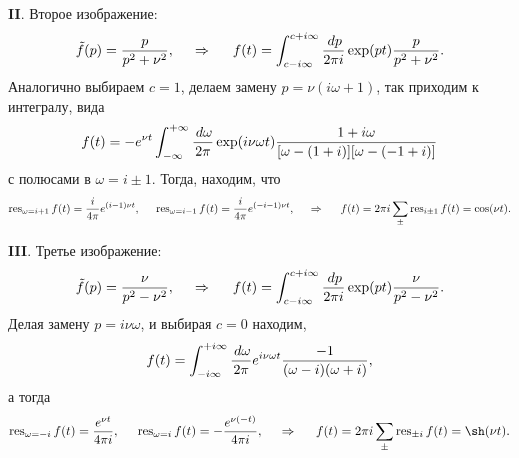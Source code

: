\textbf{II}. Второе изображение:
\begin{equation*}
    \tilde{f}(p) = \frac{p}{p^2 + \nu^2},
    \hspace{0.5cm} \Rightarrow \hspace{0.5cm}
    f(t) = \int_{c-i \infty}^{c+i \infty} \frac{\, d p}{2 \pi i} \exp(pt) \frac{p}{p^2 + \nu^2}.
\end{equation*}
Аналогично выбираем $c = 1$, делаем замену $p = \nu (i \omega + 1)$, так приходим к интегралу, вида
\begin{equation*}
    f(t) = -e^{\nu t} \int_{-\infty}^{+\infty} \frac{\, d \omega}{2 \pi} \exp(i \nu \omega t) \frac{1 + i \omega}{[\omega - (1+i)][\omega-(-1+i)]}
\end{equation*}
с полюсами в $\omega = i \pm 1$.
Тогда, находим, что
\begin{equation*}
    \mathop{\mathrm{res}}\nolimits_{\omega = i + 1} f(t) = \frac{i}{4 \pi} e^{(i-1) \nu t},
    \hspace{5 mm} 
    \mathop{\mathrm{res}}\nolimits_{\omega = i - 1} f(t)= \frac{i}{4 \pi} e^{(-i-1) \nu t},
    \hspace{0.5cm} \Rightarrow \hspace{0.5cm}
    f(t) = 2 \pi i \sum_\pm \mathop{\mathrm{res}}\nolimits_{i \pm 1} f(t) = \cos(\nu t).
\end{equation*}



\textbf{III}. Третье изображение:
\begin{equation*}
    \tilde{f}(p) = \frac{\nu}{p^2 - \nu^2},
    \hspace{0.5cm} \Rightarrow \hspace{0.5cm}
     f(t) = \int_{c-i \infty}^{c+i \infty} \frac{\, d p}{2 \pi i} \exp(pt) \frac{\nu}{p^2 - \nu^2}.
\end{equation*}
Делая замену $p = i \nu \omega$, и выбирая $c=0$ находим,
\begin{equation*}
    f(t) = \int_{-i \infty}^{+i \infty} \frac{\, d \omega}{2\pi} e^{i \nu \omega t} \frac{-1}{( \omega - i)( \omega + i)},
\end{equation*}
а тогда
\begin{equation*}
    \res_{\omega = -i} f(t) = \frac{e^{\nu  t}}{4 \pi i},
    \hspace{5 mm} 
    \res_{\omega = i} f(t)= -\frac{e^{\nu  (-t)}}{4 \pi i},
    \hspace{0.5cm} \Rightarrow \hspace{0.5cm}
    f(t) = 2 \pi i \sum_\pm \res_{\pm i} f(t) = \sh(\nu t).
\end{equation*}




